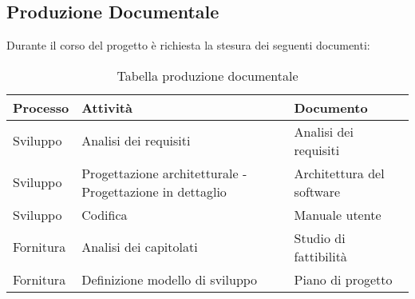 \documentclass[../NormediProgetto.tex]{subfiles}
\begin{document}
\subsection{Produzione Documentale}
Durante il corso del progetto è richiesta la stesura dei seguenti documenti:
\begin{longtable}{| p{4cm} |p{5cm} | p{4cm} |}
	\caption {Tabella produzione documentale} \label{tab:title} \\
	\hline
	\textbf{Processo} & \textbf{Attività} & \textbf{Documento} \\
	\hline
	\endhead
	
	\newline Sviluppo &
	\newline Analisi dei requisiti &
	\newline Analisi dei requisiti \newline 
	\\[1em]
	
	\hline
	
	\newline Sviluppo &
	\newline Progettazione architetturale - Progettazione in dettaglio  &
	\newline Architettura del software \newline 
	\\[1em]
	
	\hline
	
	\newline Sviluppo &
	\newline Codifica &
	\newline Manuale utente \newline 
	\\[1em]
	
	\hline
	
	\newline Fornitura &
	\newline Analisi dei capitolati &
	\newline Studio di fattibilità \newline 
	\\[1em]
	
	\hline
	
	\newline Fornitura &
	\newline Definizione modello di sviluppo &
	\newline Piano di progetto \newline 
	\\[1em]
	

\end{longtable}
\end{document}
